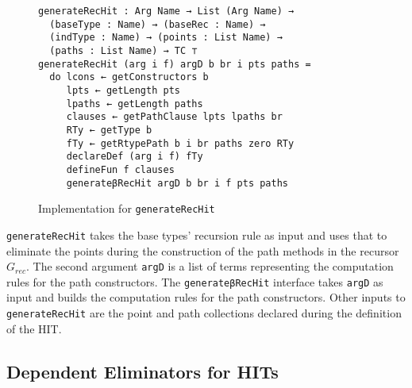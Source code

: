 \documentclass[sigplan,10pt]{acmart}
\begin{document}

\begin{figure}
\begin{center}
\begingroup
\begin{Verbatim}
generateRecHit : Arg Name → List (Arg Name) → 
  (baseType : Name) → (baseRec : Name) → 
  (indType : Name) → (points : List Name) → 
  (paths : List Name) → TC ⊤
generateRecHit (arg i f) argD b br i pts paths =
  do lcons ← getConstructors b
     lpts ← getLength pts
     lpaths ← getLength paths
     clauses ← getPathClause lpts lpaths br
     RTy ← getType b
     fTy ← getRtypePath b i br paths zero RTy
     declareDef (arg i f) fTy
     defineFun f clauses
     generateβRecHit argD b br i f pts paths
\end{Verbatim}
\endgroup
\end{center}
\caption{Implementation for {\tt generateRecHit}}
\label{fig:generateRecHit}
\end{figure}
\normalsize

{\tt generateRecHit} takes the base types' recursion rule as input and uses that to eliminate the points during the construction of the path methods in the recursor $G_{rec}$.
The second argument {\tt argD} is a list of terms representing the computation rules for the path constructors.
The {\tt generateβRecHit} interface takes {\tt argD} as input and builds the computation rules for the path constructors. Other inputs to {\tt generateRecHit} are the point and path collections declared during the definition of the HIT.

\subsection{Dependent Eliminators for HITs}
\label{sec:sec4.3}
\end{document}
